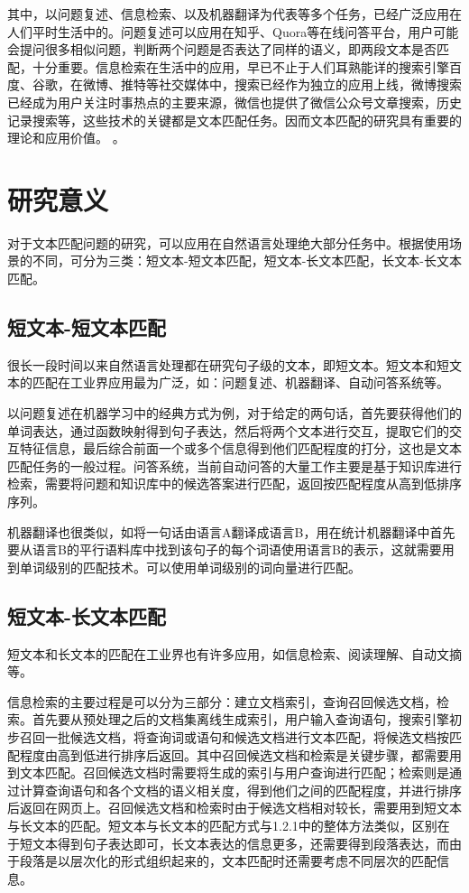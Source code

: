 其中，以问题复述、信息检索、以及机器翻译为代表等多个任务，已经广泛应用在人们平时生活中的。问题复述可以应用在知乎、Quora等在线问答平台，用户可能会提问很多相似问题，判断两个问题是否表达了同样的语义，即两段文本是否匹配，十分重要。信息检索在生活中的应用，早已不止于人们耳熟能详的搜索引擎百度、谷歌，在微博、推特等社交媒体中，搜索已经作为独立的应用上线，微博搜索已经成为用户关注时事热点的主要来源，微信也提供了微信公众号文章搜索，历史记录搜索等，这些技术的关键都是文本匹配任务。因而文本匹配的研究具有重要的理论和应用价值。
\cite{zhang2010tree}。

\section{研究意义}
对于文本匹配问题的研究，可以应用在自然语言处理绝大部分任务中。根据使用场景的不同，可分为三类：短文本-短文本匹配，短文本-长文本匹配，长文本-长文本匹配。

\subsection{短文本-短文本匹配}
很长一段时间以来自然语言处理都在研究句子级的文本，即短文本。短文本和短文本的匹配在工业界应用最为广泛，如：问题复述、机器翻译、自动问答系统等。

以问题复述在机器学习中的经典方式为例，对于给定的两句话，首先要获得他们的单词表达，通过函数映射得到句子表达，然后将两个文本进行交互，提取它们的交互特征信息，最后综合前面一个或多个信息得到他们匹配程度的打分，这也是文本匹配任务的一般过程。问答系统，当前自动问答的大量工作主要是基于知识库进行检索，需要将问题和知识库中的候选答案进行匹配，返回按匹配程度从高到低排序序列。

机器翻译也很类似，如将一句话由语言A翻译成语言B，用在统计机器翻译中首先要从语言B的平行语料库中找到该句子的每个词语使用语言B的表示，这就需要用到单词级别的匹配技术。可以使用单词级别的词向量进行匹配。

\subsection{短文本-长文本匹配}
短文本和长文本的匹配在工业界也有许多应用，如信息检索、阅读理解、自动文摘等。

信息检索的主要过程是可以分为三部分：建立文档索引，查询召回候选文档，检索。首先要从预处理之后的文档集离线生成索引，用户输入查询语句，搜索引擎初步召回一批候选文档，将查询词或语句和候选文档进行文本匹配，将候选文档按匹配程度由高到低进行排序后返回。其中召回候选文档和检索是关键步骤，都需要用到文本匹配。召回候选文档时需要将生成的索引与用户查询进行匹配；检索则是通过计算查询语句和各个文档的语义相关度，得到他们之间的匹配程度，并进行排序后返回在网页上。召回候选文档和检索时由于候选文档相对较长，需要用到短文本与长文本的匹配。短文本与长文本的匹配方式与1.2.1中的整体方法类似，区别在于短文本得到句子表达即可，长文本表达的信息更多，还需要得到段落表达，而由于段落是以层次化的形式组织起来的，文本匹配时还需要考虑不同层次的匹配信息。

